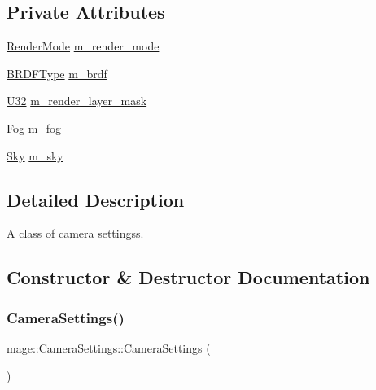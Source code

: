 \subsection*{Private Attributes}
\begin{DoxyCompactItemize}
\item 
\hyperlink{namespacemage_a5e7e18b0154373ce8fc942fe3f6b27fd}{Render\+Mode} \hyperlink{classmage_1_1_camera_settings_aa4d5139b4e8668c58507ead30812c84b}{m\+\_\+render\+\_\+mode}
\item 
\hyperlink{namespacemage_ae7a7a03a7b34d7e2689689bb8295cd38}{B\+R\+D\+F\+Type} \hyperlink{classmage_1_1_camera_settings_ac6a51ea7c770af79de4f97b53cab83b7}{m\+\_\+brdf}
\item 
\hyperlink{namespacemage_a41c104c036fba3756a74e19f793eeaa1}{U32} \hyperlink{classmage_1_1_camera_settings_ad27594c8dc755e0dd8ca55564a4dff8b}{m\+\_\+render\+\_\+layer\+\_\+mask}
\item 
\hyperlink{classmage_1_1_fog}{Fog} \hyperlink{classmage_1_1_camera_settings_aef4d9aa95d6fe74fc241edab6de8bd3f}{m\+\_\+fog}
\item 
\hyperlink{classmage_1_1_sky}{Sky} \hyperlink{classmage_1_1_camera_settings_a04d1f51641e049d027cce65f596d33cc}{m\+\_\+sky}
\end{DoxyCompactItemize}


\subsection{Detailed Description}
A class of camera settingss. 

\subsection{Constructor \& Destructor Documentation}
\hypertarget{classmage_1_1_camera_settings_aaade0b72e225ace41e903fcf8108094c}{}\label{classmage_1_1_camera_settings_aaade0b72e225ace41e903fcf8108094c} 
\subsubsection{\texorpdfstring{Camera\+Settings()}{CameraSettings()}\hspace{0.1cm}{\footnotesize\ttfamily [1/3]}}
{\footnotesize\ttfamily mage\+::\+Camera\+Settings\+::\+Camera\+Settings (\begin{DoxyParamCaption}{ }\end{DoxyParamCaption})\hspace{0.3cm}{\ttfamily [noexcept]}}

